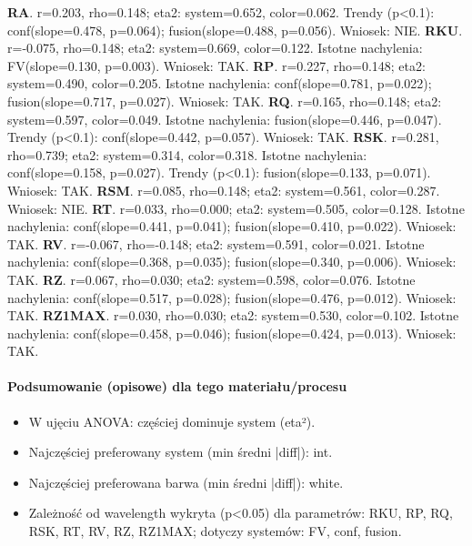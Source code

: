 \documentclass[
  10pt,
]{article}
\begin{document}
\textbf{RA}. r=0.203, rho=0.148; eta2: system=0.652, color=0.062. Trendy
(p\textless0.1): conf(slope=0.478, p=0.064); fusion(slope=0.488,
p=0.056). Wniosek: NIE. \textbf{RKU}. r=-0.075, rho=0.148; eta2:
system=0.669, color=0.122. Istotne nachylenia: FV(slope=0.130, p=0.003).
Wniosek: TAK. \textbf{RP}. r=0.227, rho=0.148; eta2: system=0.490,
color=0.205. Istotne nachylenia: conf(slope=0.781, p=0.022);
fusion(slope=0.717, p=0.027). Wniosek: TAK. \textbf{RQ}. r=0.165,
rho=0.148; eta2: system=0.597, color=0.049. Istotne nachylenia:
fusion(slope=0.446, p=0.047). Trendy (p\textless0.1): conf(slope=0.442,
p=0.057). Wniosek: TAK. \textbf{RSK}. r=0.281, rho=0.739; eta2:
system=0.314, color=0.318. Istotne nachylenia: conf(slope=0.158,
p=0.027). Trendy (p\textless0.1): fusion(slope=0.133, p=0.071). Wniosek:
TAK. \textbf{RSM}. r=0.085, rho=0.148; eta2: system=0.561, color=0.287.
Wniosek: NIE. \textbf{RT}. r=0.033, rho=0.000; eta2: system=0.505,
color=0.128. Istotne nachylenia: conf(slope=0.441, p=0.041);
fusion(slope=0.410, p=0.022). Wniosek: TAK. \textbf{RV}. r=-0.067,
rho=-0.148; eta2: system=0.591, color=0.021. Istotne nachylenia:
conf(slope=0.368, p=0.035); fusion(slope=0.340, p=0.006). Wniosek: TAK.
\textbf{RZ}. r=0.067, rho=0.030; eta2: system=0.598, color=0.076.
Istotne nachylenia: conf(slope=0.517, p=0.028); fusion(slope=0.476,
p=0.012). Wniosek: TAK. \textbf{RZ1MAX}. r=0.030, rho=0.030; eta2:
system=0.530, color=0.102. Istotne nachylenia: conf(slope=0.458,
p=0.046); fusion(slope=0.424, p=0.013). Wniosek: TAK.

\paragraph{Podsumowanie (opisowe) dla tego materiału/procesu}
\begin{itemize}
\item W ujęciu ANOVA: częściej dominuje system (eta²).
\item Najczęściej preferowany system (min średni |diff|): int.
\item Najczęściej preferowana barwa (min średni |diff|): white.
\item Zależność od wavelength wykryta (p<0.05) dla parametrów: RKU, RP, RQ, RSK, RT, RV, RZ, RZ1MAX; dotyczy systemów: FV, conf, fusion.
\end{itemize}
\end{document}
